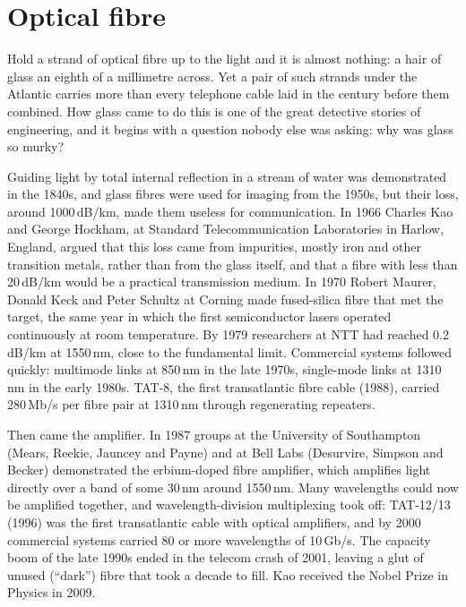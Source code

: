 \section{Optical fibre}
\label{sec:ch24:fibre}

Hold a strand of optical fibre up to the light and it is almost nothing: a hair of glass an eighth
of a millimetre across. Yet a pair of such strands under the Atlantic carries more than every
telephone cable laid in the century before them combined. How glass came to do this is one of the
great detective stories of engineering, and it begins with a question nobody else was asking: why
was glass so murky?



\begin{history}
Guiding light by total internal reflection in a stream of water was demonstrated in the 1840s, and
glass fibres were used for imaging from the 1950s, but their loss, around 1000\,dB/km, made them useless
for communication. In 1966 Charles Kao and George Hockham, at Standard Telecommunication Laboratories in
Harlow, England, argued that this loss came from impurities, mostly iron and other transition metals,
rather than from the glass itself, and that a fibre with less than 20\,dB/km would be a practical
transmission medium. In 1970 Robert Maurer, Donald Keck and Peter Schultz at Corning made fused-silica
fibre that met the target, the same year in which the first semiconductor lasers operated continuously
at room temperature. By 1979 researchers at NTT had reached 0.2\,dB/km at 1550\,nm, close to the
fundamental limit. Commercial systems followed quickly: multimode links at 850\,nm in the late 1970s,
single-mode links at 1310\,nm in the early 1980s. TAT-8, the first transatlantic fibre cable (1988),
carried 280\,Mb/s per fibre pair at 1310\,nm through regenerating repeaters.

Then came the amplifier. In 1987 groups at the University of Southampton (Mears, Reekie, Jauncey and
Payne) and at Bell Labs (Desurvire, Simpson and Becker) demonstrated the erbium-doped fibre amplifier,
which amplifies light directly over a band of some 30\,nm around 1550\,nm. Many wavelengths could now be
amplified together, and wavelength-division multiplexing took off: TAT-12/13 (1996) was the first
transatlantic cable with optical amplifiers, and by 2000 commercial systems carried 80 or more
wavelengths of 10\,Gb/s. The capacity boom of the late 1990s ended in the telecom crash of 2001,
leaving a glut of unused (``dark'') fibre that took a decade to fill. Kao received the Nobel Prize in
Physics in 2009.
\end{history}



